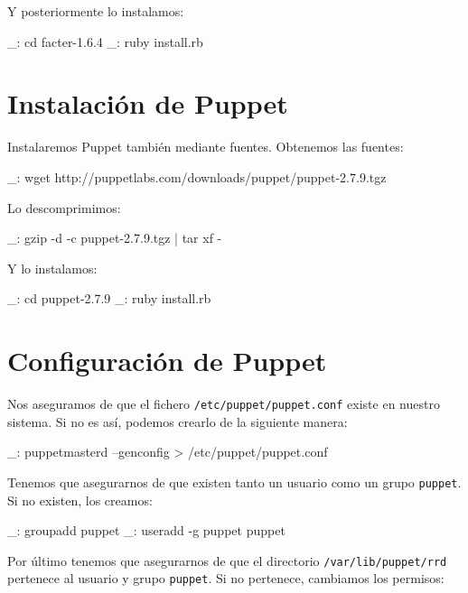 Y posteriormente lo instalamos:

\begin{bashcode}
_: cd facter-1.6.4
_: ruby install.rb
\end{bashcode}


\section{Instalación de Puppet}

Instalaremos Puppet también mediante fuentes. Obtenemos las fuentes:

\begin{bashcode}
_: wget http://puppetlabs.com/downloads/puppet/puppet-2.7.9.tgz
\end{bashcode}

Lo descomprimimos:

\begin{bashcode}
_: gzip -d -c puppet-2.7.9.tgz | tar xf -
\end{bashcode}

Y lo instalamos:

\begin{bashcode}
_: cd puppet-2.7.9
_: ruby install.rb
\end{bashcode}


\section{Configuración de Puppet}

Nos aseguramos de que el fichero \texttt{/etc/puppet/puppet.conf} existe en nuestro sistema. Si no es así, podemos crearlo de la siguiente manera:

\begin{bashcode}
_: puppetmasterd --genconfig > /etc/puppet/puppet.conf
\end{bashcode}

Tenemos que asegurarnos de que existen tanto un usuario como un grupo \texttt{puppet}. Si no existen, los creamos:

\begin{bashcode}
_: groupadd puppet
_: useradd -g puppet puppet
\end{bashcode}

Por último tenemos que asegurarnos de que el directorio \texttt{/var/lib/puppet/rrd} pertenece al usuario y grupo \texttt{puppet}. Si no pertenece, cambiamos los permisos:

